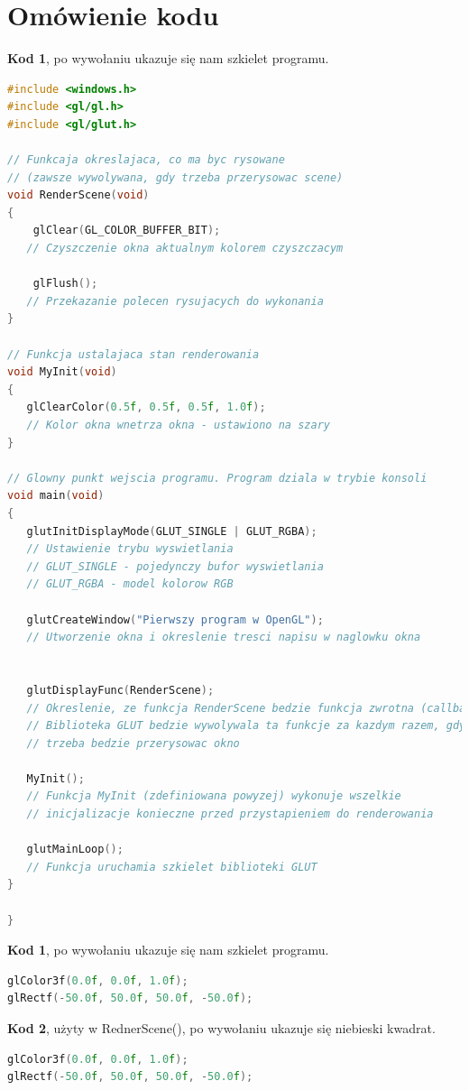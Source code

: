 \documentclass[polish,polish,a4paper]{article}
\begin{document}
  \section{Omówienie kodu}
   \textbf{Kod 1}, po wywołaniu ukazuje się nam szkielet programu.  
{\small
\begin{lstlisting}[language=C++]
#include <windows.h>
#include <gl/gl.h>
#include <gl/glut.h>

// Funkcaja okreslajaca, co ma byc rysowane 
// (zawsze wywolywana, gdy trzeba przerysowac scene)
void RenderScene(void)
{
    glClear(GL_COLOR_BUFFER_BIT); 
   // Czyszczenie okna aktualnym kolorem czyszczacym

    glFlush();
   // Przekazanie polecen rysujacych do wykonania
}

// Funkcja ustalajaca stan renderowania
void MyInit(void)
{
   glClearColor(0.5f, 0.5f, 0.5f, 1.0f);
   // Kolor okna wnetrza okna - ustawiono na szary
}

// Glowny punkt wejscia programu. Program dziala w trybie konsoli
void main(void)
{
   glutInitDisplayMode(GLUT_SINGLE | GLUT_RGBA);
   // Ustawienie trybu wyswietlania
   // GLUT_SINGLE - pojedynczy bufor wyswietlania
   // GLUT_RGBA - model kolorow RGB

   glutCreateWindow("Pierwszy program w OpenGL");
   // Utworzenie okna i okreslenie tresci napisu w naglowku okna

   
   glutDisplayFunc(RenderScene);
   // Okreslenie, ze funkcja RenderScene bedzie funkcja zwrotna (callback)
   // Biblioteka GLUT bedzie wywolywala ta funkcje za kazdym razem, gdy
   // trzeba bedzie przerysowac okno

   MyInit(); 
   // Funkcja MyInit (zdefiniowana powyzej) wykonuje wszelkie 
   // inicjalizacje konieczne przed przystapieniem do renderowania
  
   glutMainLoop();
   // Funkcja uruchamia szkielet biblioteki GLUT
}

}
\end{lstlisting}
}
  \textbf{Kod 1}, po wywołaniu ukazuje się nam szkielet programu.  
{\small
\begin{lstlisting}[language=C++]
glColor3f(0.0f, 0.0f, 1.0f);
glRectf(-50.0f, 50.0f, 50.0f, -50.0f);
\end{lstlisting}
}

  \textbf{Kod 2}, użyty w RednerScene(), po wywołaniu ukazuje się niebieski kwadrat.  
{\small
\begin{lstlisting}[language=C++]
glColor3f(0.0f, 0.0f, 1.0f);
glRectf(-50.0f, 50.0f, 50.0f, -50.0f);
\end{lstlisting}
}
\end{document}
